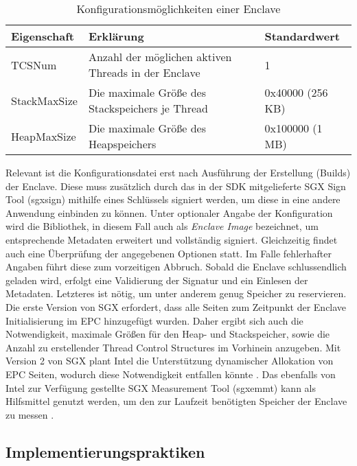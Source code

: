\begin{table}[h]
	\centering
	\caption{Konfigurationsmöglichkeiten einer Enclave}
	\begin{tabular}{|l|l|l|}
		\hline
		\textbf{Eigenschaft} & \textbf{Erklärung} & \textbf{Standardwert} \\
		\hline
		TCSNum & Anzahl der möglichen aktiven Threads in der Enclave & 1 \\
		\hline
		StackMaxSize & Die maximale Größe des Stackspeichers je Thread & 0x40000 (256 KB) \\
		\hline
		HeapMaxSize & Die maximale Größe des Heapspeichers & 0x100000 (1 MB) \\
		\hline
	\end{tabular}
	\label{tab:sgxconfig}
\end{table}

Relevant ist die Konfigurationsdatei erst nach Ausführung der Erstellung (Builds) der Enclave. Diese muss zusätzlich durch das in der \ac{SDK} mitgelieferte \ac{SGX} Sign Tool (sgx\textunderscore sign) mithilfe eines Schlüssels signiert werden, um diese in eine andere Anwendung einbinden zu können. Unter optionaler Angabe der Konfiguration wird die Bibliothek, in diesem Fall auch als \textit{Enclave Image} bezeichnet, um entsprechende Metadaten erweitert und vollständig signiert. Gleichzeitig findet auch eine Überprüfung der angegebenen Optionen statt. Im Falle fehlerhafter Angaben führt diese zum vorzeitigen Abbruch. Sobald die Enclave schlussendlich geladen wird, erfolgt eine Validierung der Signatur und ein Einlesen der Metadaten. Letzteres ist nötig, um unter anderem genug Speicher zu reservieren. Die erste Version von \ac{SGX} erfordert, dass alle Seiten zum Zeitpunkt der Enclave Initialisierung im \ac{EPC} hinzugefügt wurden. Daher ergibt sich auch die Notwendigkeit, maximale Größen für den Heap- und Stackspeicher, sowie die Anzahl zu erstellender Thread Control Structures im Vorhinein anzugeben. Mit Version 2 von \ac{SGX} plant Intel die Unterstützung dynamischer Allokation von EPC Seiten, wodurch diese Notwendigkeit entfallen könnte \cite{McKeen2016}. Das ebenfalls von Intel zur Verfügung gestellte \ac{SGX} Measurement Tool (sgx\textunderscore emmt) kann als Hilfsmittel genutzt werden, um den zur Laufzeit benötigten Speicher der Enclave zu messen \cite{WinDev}.

\subsection{Implementierungspraktiken}

